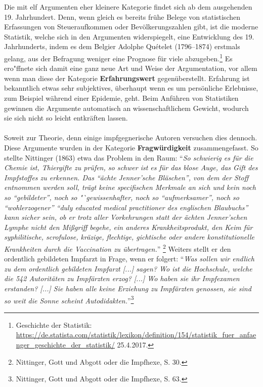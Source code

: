 \documentclass[
    a4paper,
    12pt,
    hyphens,
    chapterprefix=true,
    headheight=33pt,
    footheight=29pt,
    headings=optiontohead, %
]{scrartcl}
\begin{document}
{Die mit elf Argumenten eher kleinere Kategorie findet sich ab dem ausgehenden 19. Jahrhundert. Denn, wenn gleich es bereits frühe Belege von statistischen Erfassungen von Steueraufkommen oder Bevölkerungszahlen gibt, ist die moderne Statistik, welche sich in den Argumenten widerspiegelt, eine Entwicklung des 19. Jahrhunderts, indem es dem Belgier Adolphe Quételet (1796--1874) erstmals gelang, aus der Befragung weniger eine Prognose für viele abzugeben.\footnote{Geschichte der Statistik: \url{https://de.statista.com/statistik/lexikon/definition/154/statistik_fuer_anfaenger_geschichte_der_statistik/} 25.4.2017.} Es ero"ffnete sich damit eine ganz neue Art und Weise der Argumentation, vor allem wenn man diese der Kategorie \textbf{Erfahrungswert} gegenüberstellt. Erfahrung ist bekanntlich etwas sehr subjektives, überhaupt wenn es um persönliche Erlebnisse, zum Beispiel während einer Epidemie, geht. Beim Anführen von Statistiken gewinnen die Argumente automatisch an wissenschaftlichem Gewicht, wodurch sie sich nicht so leicht entkräften lassen. \\
\\
Soweit zur Theorie, denn einige impfgegnerische Autoren versuchen dies dennoch. Diese Argumente wurden in der Kategorie \textbf{Fragwürdigkeit}
zusammengefasst. So stellte Nittinger (1863) etwa das Problem in den Raum: "`\textit{So schwierig es für die Chemie ist, Thiergifte zu prüfen,
so schwer ist es für das blose Auge, das Gift des Impfstoffes zu erkennen. Das "`ächte Jenner'sche Bläschen"', von dem der Stoff entnommen
werden soll, trägt keine specifischen Merkmale an sich und kein noch so "`gebildeter"', noch so "`gewissenhafter, noch so "`aufmerksamer"', noch
so "`wohlerzogener"' "`duly educated medical practitioner des englischen Blaubuchs"' kann sicher sein, ob er trotz aller Vorkehrungen statt der
ächten Jenner'schen Lymphe nicht den Mißgriff begehe, ein anderes Krankheitsprodukt, den Keim für syphilitische, scrofulose, kräzige, flechtige,
gichtische oder andere konstitutionelle Krankheiten
durch die Vaccination zu übertragen.}"'
\footnote{Nittinger, Gott und Abgott oder die
Impfhexe, S. 30.} Weiters stellt er den ordentlich gebildeten Impfarzt in Frage, wenn er folgert: "`\textit{Was sollen wir endlich zu dem
ordentlich gebildeten Impfarzt [...] sagen? Wo ist die Hochschule, welche die 542 Autoritäten zu Impfärzten erzog? [...] Wo haben sie ihr
Impfexamen erstanden? [...] Sie haben alle keine Erziehung zu Impfärzten genossen, sie sind so weit die Sonne scheint
Autodidakten.}"'\footnote{Nittinger, Gott und Abgott oder die Impfhexe, S. 63.} \\
}
\end{document}
